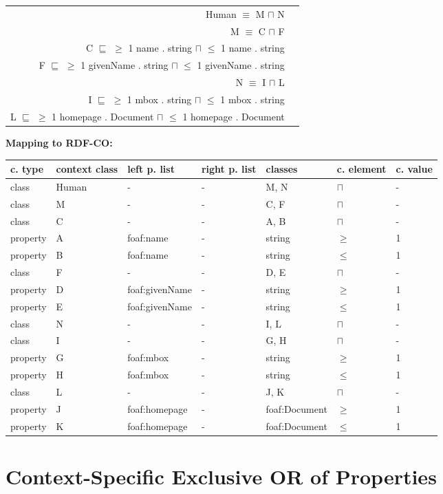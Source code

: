 \documentclass{llncs}
\newenvironment{gcotable}{
  \scriptsize
  \sffamily
  \vspace{0cm}
	\begin{center}
	\textbf{\vspace{0.4cm}Mapping to RDF-CO:} \\
  \begin{tabular}{l|l|l|l|l|l|l}
	\hline
  \textbf{c. type} & \textbf{context class} & \textbf{left p. list} & \textbf{right p. list} & \textbf{classes} & \textbf{c. element} & \textbf{c. value} \\
  \hline

}{
  \hline
  \end{tabular}
	\end{center}
}
\newenvironment{DL}{
  \vspace{0cm}
	\begin{center}
  \begin{tabular}{r l}

}{
  \end{tabular}
	\end{center}
}
\begin{document}
\begin{DL}
Human $\equiv$ M $\sqcap$ N \\
M $\equiv$ C $\sqcap$ F \\
C $\sqsubseteq$ $\geq$ 1 name . string $\sqcap$ $\leq$ 1 name . string \\
F $\sqsubseteq$ $\geq$ 1 givenName . string $\sqcap$ $\leq$ 1 givenName . string \\
N $\equiv$ I $\sqcap$ L \\
I $\sqsubseteq$ $\geq$ 1 mbox . string $\sqcap$ $\leq$ 1 mbox . string \\
L $\sqsubseteq$ $\geq$ 1 homepage . Document $\sqcap$ $\leq$ 1 homepage . Document \\
\end{DL}

\begin{gcotable}
class & Human & - & - & M, N & $\sqcap$ & - \\
\hline
class & M & - & - & C, F & $\sqcap$ & - \\
class & C & - & - & A, B & $\sqcap$ & - \\
property & A & foaf:name & - & string & $\geq$ & 1 \\
property & B & foaf:name & - & string & $\leq$ & 1 \\
class & F & - & - & D, E & $\sqcap$ & - \\
property & D & foaf:givenName & - & string & $\geq$ & 1 \\
property & E & foaf:givenName & - & string & $\leq$ & 1 \\
\hline
class & N & - & - & I, L & $\sqcap$ & - \\
class & I & - & - & G, H & $\sqcap$ & - \\
property & G & foaf:mbox & - & string & $\geq$ & 1 \\
property & H & foaf:mbox & - & string & $\leq$ & 1 \\
class & L & - & - & J, K & $\sqcap$ & - \\
property & J & foaf:homepage & - & foaf:Document & $\geq$ & 1 \\
property & K & foaf:homepage & - & foaf:Document & $\leq$ & 1 \\
\end{gcotable}

\section{Context-Specific Exclusive OR of Properties}
\end{document}
